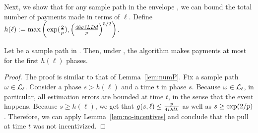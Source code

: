 Next, we show that for any sample path \SP in the envelope \Env{\ell},
we can bound the total number of payments made in terms of $\ell$.
Define $h(\ell) := \max \left( \exp(\frac{2}{p}),
\left( \frac{48 \sigma \ell L D d}{p} \right)^{5/2}
\right)$.

\begin{lemma} \label{lem:envelope-payments}
Let \SP be a sample path in \Env{\ell}.
Then, under \SP, the algorithm makes payments at most for the first 
$h(\ell)$ phases. 
\end{lemma}

\begin{proof}
The proof is similar to that of Lemma~\ref{lem:numP}.
Fix a sample path $\omega \in {\mathcal L}_{\ell}$.
Consider a phase $s > h(\ell)$ and a time $t$ in phase $s$.
Because $\omega \in {\mathcal L}_{\ell}$, in particular, all estimation errors are
bounded at time $t$, in the sense that the event 
happens.
Because $s \geq h(\ell)$, we get that
$g(s,\ell) \leq \frac{p}{4 D d L}$
as well as $s \geq \exp(2/p)$.
Therefore, we can apply Lemma~\ref{lem:no-incentives} and conclude
that the pull at time $t$ was not incentivized.
\end{proof}

